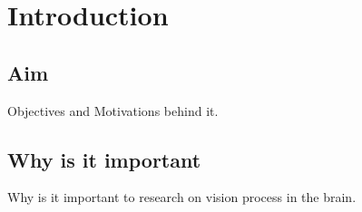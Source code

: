 \chapter{Introduction}
\label{cha:intro}

\section{Aim}
\label{sec:aim}
Objectives and Motivations behind it.

\section{Why is it important}
\label{sec:imp}
Why is it important to research on vision process in the brain.